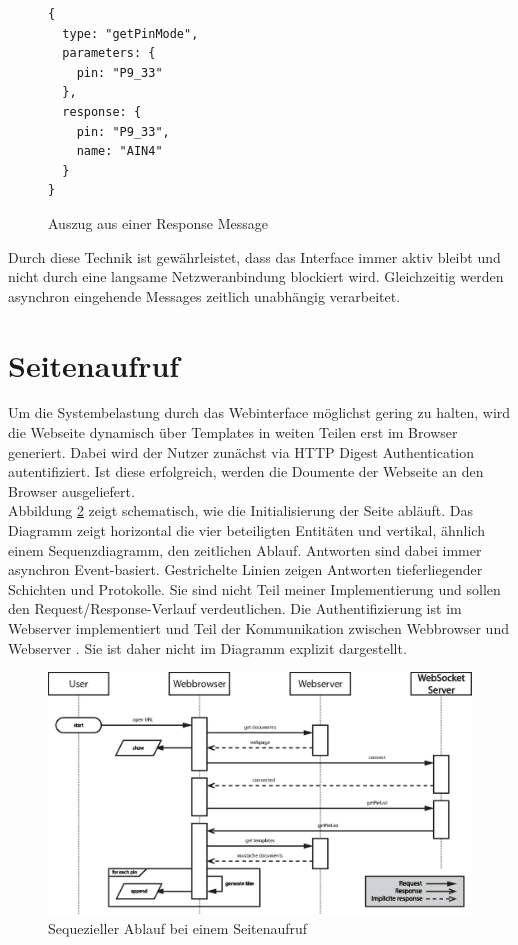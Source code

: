 \begin{figure}[ht]
\begin{lstlisting}
{
  type: "getPinMode",
  parameters: {
    pin: "P9_33"
  },
  response: {
    pin: "P9_33",
    name: "AIN4"
  }
}
\end{lstlisting}
\caption{Auszug aus einer Response Message}
\label{lst:responseMessage}
\end{figure}

Durch diese Technik ist gewährleistet, dass das Interface immer aktiv bleibt und nicht durch eine langsame Netzweranbindung blockiert wird. Gleichzeitig werden asynchron eingehende Messages zeitlich unabhängig verarbeitet.

\section{Seitenaufruf}
Um die Systembelastung durch das Webinterface möglichst gering zu halten, wird die Webseite dynamisch über Templates in weiten Teilen erst im Browser generiert. Dabei wird der Nutzer zunächst via HTTP Digest Authentication autentifiziert. Ist diese erfolgreich, werden die Doumente der Webseite an den Browser ausgeliefert.\\

Abbildung \ref{fig:pageloadSequence} zeigt schematisch, wie die Initialisierung der Seite abläuft. Das Diagramm zeigt horizontal die vier beteiligten Entitäten und vertikal, ähnlich einem Sequenzdiagramm, den zeitlichen Ablauf. Antworten sind dabei immer asynchron Event-basiert. Gestrichelte Linien zeigen Antworten tieferliegender Schichten und Protokolle. Sie sind nicht Teil meiner Implementierung und sollen den Request/Response-Verlauf verdeutlichen. Die Authentifizierung ist im Webserver implementiert und Teil der Kommunikation zwischen Webbrowser und Webserver \cite{rfc7235}. Sie ist daher nicht im Diagramm explizit dargestellt.

\begin{figure}[ht]
  \centering
  \includegraphics[width = \textwidth]{documentation/images/pageload.eps}
  \caption{Sequezieller Ablauf bei einem Seitenaufruf}
  \label{fig:pageloadSequence}
\end{figure}


